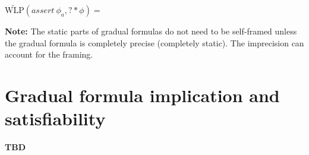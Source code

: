 \documentclass {article}
\newcommand{\twlp}[2]{\widetilde{\text{WLP}}(#1,#2)}
\begin{document}
%
%
%

\vspace{0.5cm}

$\twlp{assert\ \phi_a}{? \ast \phi} = $

%
%
%
%

\textbf{Note:} The static parts of gradual formulas do not need to be self-framed unless the gradual formula is completely precise (completely static). The imprecision can account for the framing.

\section{Gradual formula implication and satisfiability}

\textbf{TBD}
\end{document}
